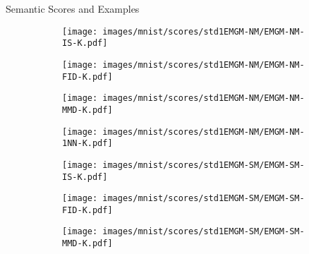 \begin{frame}[label=current]{Semantic Scores and Examples}
  \graphicspath{{/home/dong/Documents/phd_research/phdthesis/source/chapter6/}}
  \begin{figure}
    \captionsetup[subfigure]{justification=centering}
    \centering
    \begin{subfigure}{.24\textwidth}
      \centering
      \texttt{[image: images/mnist/scores/std1EMGM-NM/EMGM-NM-IS-K.pdf]}
    \end{subfigure}
    \vspace{-2pt}
    \begin{subfigure}{.24\textwidth}
      \centering
      \texttt{[image: images/mnist/scores/std1EMGM-NM/EMGM-NM-FID-K.pdf]}
    \end{subfigure}
    \centering
    \begin{subfigure}{.24\textwidth}
      \centering
      \texttt{[image: images/mnist/scores/std1EMGM-NM/EMGM-NM-MMD-K.pdf]}
    \end{subfigure}
    \centering
    \begin{subfigure}{0.24\textwidth}
      \centering
      \texttt{[image: images/mnist/scores/std1EMGM-NM/EMGM-NM-1NN-K.pdf]}
    \end{subfigure}
    \centering
    \begin{subfigure}{.24\textwidth}
      \centering
      \texttt{[image: images/mnist/scores/std1EMGM-SM/EMGM-SM-IS-K.pdf]}
    \end{subfigure}
    \centering
    \begin{subfigure}{.24\textwidth}
      \centering
      \texttt{[image: images/mnist/scores/std1EMGM-SM/EMGM-SM-FID-K.pdf]}
    \end{subfigure}
    \centering
    \begin{subfigure}{.24\textwidth}
      \centering
      \texttt{[image: images/mnist/scores/std1EMGM-SM/EMGM-SM-MMD-K.pdf]}
    \end{subfigure}
    \begin{subfigure}{0.24\textwidth}

\end{subfigure}
\end{figure}
\end{frame}
